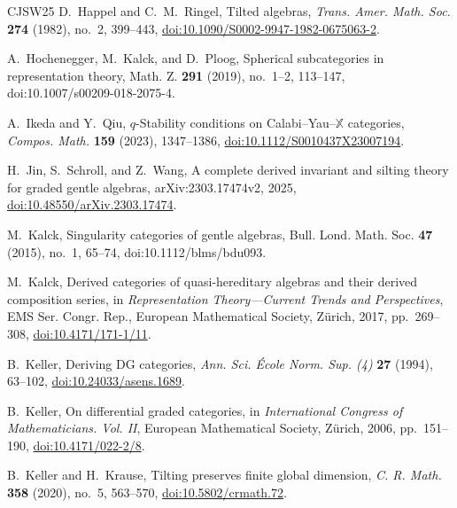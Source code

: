 \documentclass[11pt]{amsart}
\theoremstyle{definition}
\theoremstyle{plain}
\theoremstyle{definition}
\theoremstyle{definition}
\begin{document}
\begin{thebibliography}{CJSW25}
D.~Happel and C.~M.~Ringel,
\newblock Tilted algebras,
\newblock \emph{Trans. Amer. Math. Soc.} \textbf{274} (1982), no.~2,
399--443,
\newblock \href{https://doi.org/10.1090/S0002-9947-1982-0675063-2}
{doi:10.1090/S0002-9947-1982-0675063-2}.


A.~Hochenegger, M.~Kalck, and D.~Ploog,
Spherical subcategories in representation theory,
Math. Z. \textbf{291} (2019), no.~1--2, 113--147,
doi:10.1007/s00209-018-2075-4.

A.~Ikeda and Y.~Qiu,
\newblock $q$-Stability conditions on
Calabi--Yau--$\mathbb X$ categories,
\newblock \emph{Compos. Math.} \textbf{159} (2023),
1347--1386,
\newblock
\href{https://doi.org/10.1112/S0010437X23007194}
{doi:10.1112/S0010437X23007194}.

H.~Jin, S.~Schroll, and Z.~Wang,
\newblock A complete derived invariant and silting theory for graded gentle
algebras,
\newblock arXiv:2303.17474v2, 2025,
\newblock \href{https://doi.org/10.48550/arXiv.2303.17474}
{doi:10.48550/arXiv.2303.17474}.




M.~Kalck,
Singularity categories of gentle algebras,
Bull. Lond. Math. Soc. \textbf{47} (2015), no.~1, 65--74,
doi:10.1112/blms/bdu093.

M.~Kalck,
\newblock Derived categories of quasi-hereditary algebras and their derived
composition series,
\newblock in \emph{Representation Theory---Current Trends and Perspectives},
EMS Ser. Congr. Rep., European Mathematical Society, Z\"urich, 2017,
pp.~269--308,
\newblock \href{https://doi.org/10.4171/171-1/11}
{doi:10.4171/171-1/11}.


B.~Keller,
\newblock Deriving DG categories,
\newblock \emph{Ann. Sci. {\'E}cole Norm. Sup. (4)} \textbf{27} (1994),
63--102,
\newblock \href{https://doi.org/10.24033/asens.1689}
{doi:10.24033/asens.1689}.

B.~Keller,
\newblock On differential graded categories,
\newblock in \emph{International Congress of Mathematicians. Vol. II},
European Mathematical Society, Z\"urich, 2006, pp.~151--190,
\newblock \href{https://doi.org/10.4171/022-2/8}
{doi:10.4171/022-2/8}.

B.~Keller and H.~Krause,
\newblock Tilting preserves finite global dimension,
\newblock \emph{C. R. Math.} \textbf{358} (2020), no.~5, 563--570,
\newblock \href{https://doi.org/10.5802/crmath.72}
{doi:10.5802/crmath.72}.


\end{thebibliography}
\end{document}
